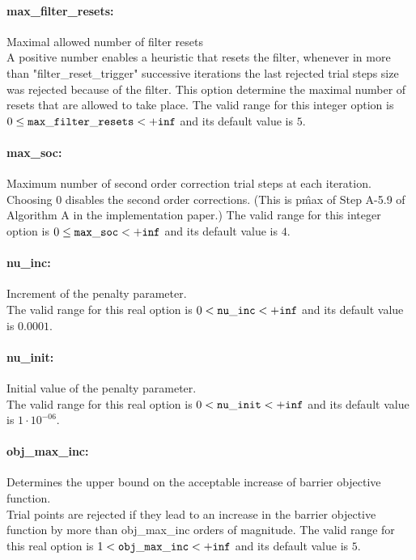 \paragraph{max\_filter\_resets:}\label{opt:max_filter_resets} Maximal allowed number of filter resets \\
 A positive number enables a heuristic that resets the filter, whenever in more than "filter\_reset\_trigger" successive iterations the last rejected trial steps size was rejected because of the filter.  This option determine the maximal number of resets that are allowed to take place. The valid range for this integer option is
$0 \le {\tt max\_filter\_resets } <  {\tt +inf}$
and its default value is $5$.


\paragraph{max\_soc:}\label{opt:max_soc} Maximum number of second order correction trial steps at each iteration. \\
 Choosing 0 disables the second order corrections. (This is p\^{max} of Step A-5.9 of Algorithm A in the implementation paper.) The valid range for this integer option is
$0 \le {\tt max\_soc } <  {\tt +inf}$
and its default value is $4$.


\paragraph{nu\_inc:}\label{opt:nu_inc} Increment of the penalty parameter. \\
 The valid range for this real option is 
$0 <  {\tt nu\_inc } <  {\tt +inf}$
and its default value is $0.0001$.


\paragraph{nu\_init:}\label{opt:nu_init} Initial value of the penalty parameter. \\
 The valid range for this real option is 
$0 <  {\tt nu\_init } <  {\tt +inf}$
and its default value is $1 \cdot 10^{-06}$.


\paragraph{obj\_max\_inc:}\label{opt:obj_max_inc} Determines the upper bound on the acceptable increase of barrier objective function. \\
 Trial points are rejected if they lead to an increase in the barrier objective function by more than obj\_max\_inc orders of magnitude. The valid range for this real option is 
$1 <  {\tt obj\_max\_inc } <  {\tt +inf}$
and its default value is $5$.


